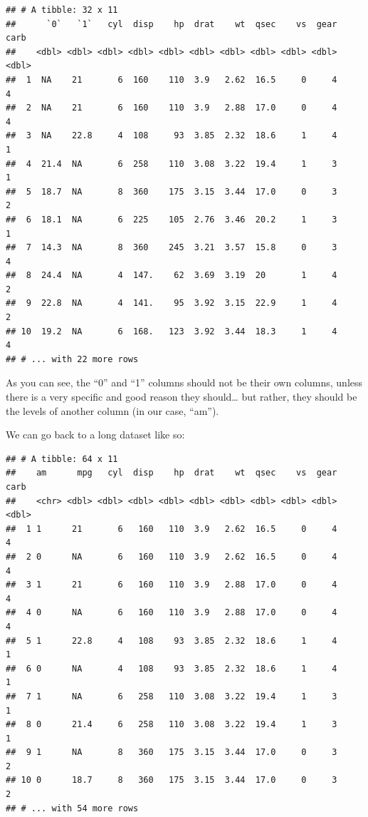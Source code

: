 \documentclass[]{gitbook}
\newenvironment{Shaded}{\begin{snugshade}}{\end{snugshade}}
\newcommand{\DataTypeTok}[1]{\textcolor[rgb]{0.13,0.29,0.53}{#1}}
\newcommand{\KeywordTok}[1]{\textcolor[rgb]{0.13,0.29,0.53}{\textbf{#1}}}
\newcommand{\NormalTok}[1]{#1}
\newcommand{\OperatorTok}[1]{\textcolor[rgb]{0.81,0.36,0.00}{\textbf{#1}}}
\newcommand{\StringTok}[1]{\textcolor[rgb]{0.31,0.60,0.02}{#1}}
\begin{document}
\begin{verbatim}
## # A tibble: 32 x 11
##      `0`   `1`   cyl  disp    hp  drat    wt  qsec    vs  gear  carb
##    <dbl> <dbl> <dbl> <dbl> <dbl> <dbl> <dbl> <dbl> <dbl> <dbl> <dbl>
##  1  NA    21       6  160    110  3.9   2.62  16.5     0     4     4
##  2  NA    21       6  160    110  3.9   2.88  17.0     0     4     4
##  3  NA    22.8     4  108     93  3.85  2.32  18.6     1     4     1
##  4  21.4  NA       6  258    110  3.08  3.22  19.4     1     3     1
##  5  18.7  NA       8  360    175  3.15  3.44  17.0     0     3     2
##  6  18.1  NA       6  225    105  2.76  3.46  20.2     1     3     1
##  7  14.3  NA       8  360    245  3.21  3.57  15.8     0     3     4
##  8  24.4  NA       4  147.    62  3.69  3.19  20       1     4     2
##  9  22.8  NA       4  141.    95  3.92  3.15  22.9     1     4     2
## 10  19.2  NA       6  168.   123  3.92  3.44  18.3     1     4     4
## # ... with 22 more rows
\end{verbatim}

As you can see, the ``0'' and ``1'' columns should not be their own columns, unless there is a very
specific and good reason they should\ldots{} but rather, they should be the levels of another column (in
our case, ``am'').

We can go back to a long dataset like so:

\begin{Shaded}
\end{Shaded}

\begin{verbatim}
## # A tibble: 64 x 11
##    am      mpg   cyl  disp    hp  drat    wt  qsec    vs  gear  carb
##    <chr> <dbl> <dbl> <dbl> <dbl> <dbl> <dbl> <dbl> <dbl> <dbl> <dbl>
##  1 1      21       6   160   110  3.9   2.62  16.5     0     4     4
##  2 0      NA       6   160   110  3.9   2.62  16.5     0     4     4
##  3 1      21       6   160   110  3.9   2.88  17.0     0     4     4
##  4 0      NA       6   160   110  3.9   2.88  17.0     0     4     4
##  5 1      22.8     4   108    93  3.85  2.32  18.6     1     4     1
##  6 0      NA       4   108    93  3.85  2.32  18.6     1     4     1
##  7 1      NA       6   258   110  3.08  3.22  19.4     1     3     1
##  8 0      21.4     6   258   110  3.08  3.22  19.4     1     3     1
##  9 1      NA       8   360   175  3.15  3.44  17.0     0     3     2
## 10 0      18.7     8   360   175  3.15  3.44  17.0     0     3     2
## # ... with 54 more rows
\end{verbatim}
\end{document}
